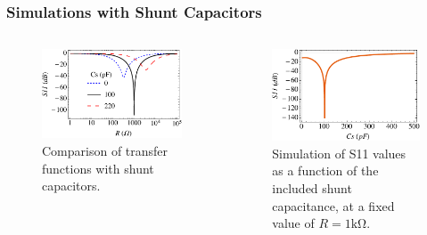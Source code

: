 \documentclass{beamer}
\begin{document}
\begin{frame}
    \frametitle{Simulations with Shunt Capacitors}

    \begin{columns}
        \begin{column}{0.5\textwidth}
            \begin{figure}
                \centering
                \includegraphics[width=\textwidth]{cs_comparison.pdf}
                \caption{Comparison of transfer functions with shunt capacitors.}
                \label{fig:cscomparison}
            \end{figure}
        \end{column}
        \begin{column}{0.5\textwidth}

            \begin{figure}
                \centering
                \includegraphics[width = \textwidth]{cs_simulation.pdf}
                \caption{Simulation of S11 values as a function of the included shunt capacitance, at a fixed value of $R = 1\si{\kilo\ohm}$.}
                \label{fig:cssimulation}
            \end{figure}
        \end{column}
    \end{columns}


\end{frame}
\end{document}
